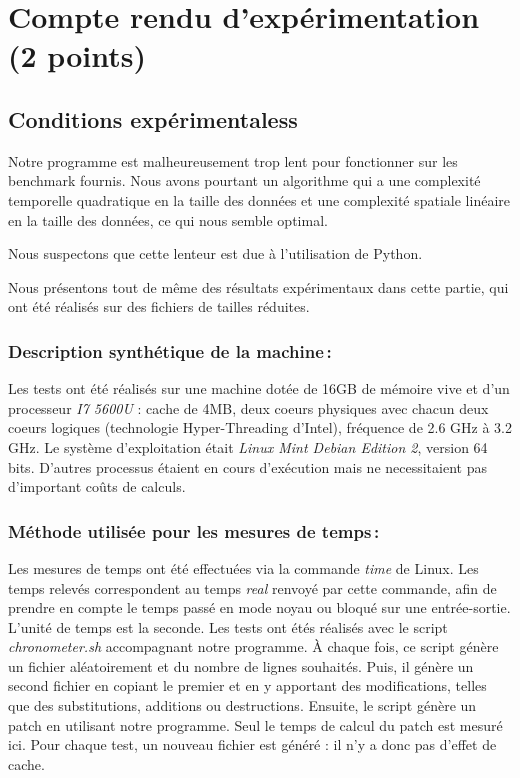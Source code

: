 \documentclass[a4paper, 10pt, french]{article}
\begin{document}
\section{Compte rendu d'expérimentation (2 points)}
  \subsection{Conditions expérimentaless}
    Notre programme est malheureusement trop lent pour fonctionner sur les benchmark fournis.
    Nous avons pourtant un algorithme qui a une complexité temporelle quadratique
    en la taille des données et une complexité spatiale linéaire en la taille des données,
    ce qui nous semble optimal.

    Nous suspectons que cette lenteur est due à l'utilisation de Python.

    Nous présentons tout de même des résultats expérimentaux dans cette partie,
    qui ont été réalisés sur des fichiers de tailles réduites.

    \subsubsection{Description synthétique de la machine\,:}
      Les tests ont été réalisés sur une machine dotée de 16GB de mémoire vive et
      d'un processeur \emph{I7 5600U} : cache de 4MB, deux coeurs physiques avec
      chacun deux coeurs logiques (technologie Hyper-Threading d'Intel), fréquence
      de 2.6 GHz à 3.2 GHz.
      Le système d'exploitation était \emph{Linux Mint Debian Edition 2}, version 64 bits.
      D'autres processus étaient en cours d'exécution mais ne necessitaient pas
      d'important coûts de calculs.

    \subsubsection{Méthode utilisée pour les mesures de temps\,: }
      Les mesures de temps ont été effectuées via la commande \emph{time} de Linux.
      Les temps relevés correspondent au temps \emph{real} renvoyé par cette commande,
      afin de prendre en compte le temps passé en mode noyau ou bloqué sur une
      entrée-sortie.
      L'unité de temps est la seconde.
      Les tests ont étés réalisés avec le script \emph{chronometer.sh} accompagnant
      notre programme. À chaque fois, ce script génère un fichier aléatoirement et
      du nombre de lignes souhaités. Puis, il génère un second fichier en copiant
      le premier et en y apportant des modifications, telles que des substitutions,
      additions ou destructions. Ensuite, le script génère un patch en utilisant
      notre programme. Seul le temps de calcul du patch est mesuré ici.
      Pour chaque test, un nouveau fichier est généré : il n'y a donc pas d'effet
      de cache.
\end{document}
